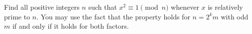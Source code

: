 Find all positive integers $n$ such that $x^2\equiv1\pmod n$ whenever $x$ is relatively prime to $n$. You may use the fact that the property holds for $n=2^km$ with odd $m$ if and only if it holds for both factors.
